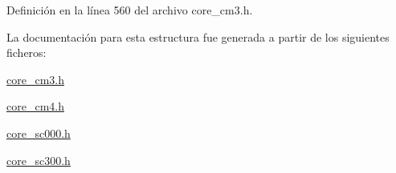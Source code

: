 Definición en la línea 560 del archivo core\+\_\+cm3.\+h.



La documentación para esta estructura fue generada a partir de los siguientes ficheros\+:\begin{DoxyCompactItemize}
\item 
\hyperlink{core__cm3_8h}{core\+\_\+cm3.\+h}\item 
\hyperlink{core__cm4_8h}{core\+\_\+cm4.\+h}\item 
\hyperlink{core__sc000_8h}{core\+\_\+sc000.\+h}\item 
\hyperlink{core__sc300_8h}{core\+\_\+sc300.\+h}\end{DoxyCompactItemize}
